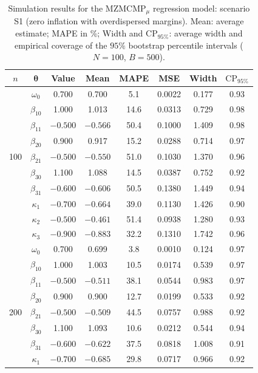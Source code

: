 \begin{table}[pos=htbp]
	\centering
	\caption{Simulation results for the $\mathrm{MZMCMP}_{\mu}$ regression model: scenario S1 (zero inflation with overdispersed margins). Mean: average estimate; MAPE in \%; Width and $\mathrm{CP}_{95\%}$: average width and empirical coverage of the $95\%$ bootstrap percentile intervals ($N=100$, $B=500$).}
	\label{tab:sim_S1}
	\begin{tabular}{@{}cccccccc@{}}
		\toprule
		$n$ & $\bm{\theta}$ & Value & Mean & MAPE & MSE & Width & $\mathrm{CP}_{95\%}$ \\
		\midrule
		 & $\omega_0$ & 0.700 & 0.700 & 5.1 & 0.0022 & 0.177 & 0.93 \\
		 & $\beta_{10}$ & 1.000 & 1.013 & 14.6 & 0.0313 & 0.729 & 0.98 \\
		 & $\beta_{11}$ & $-0.500$ & $-0.566$ & 50.4 & 0.1000 & 1.409 & 0.98 \\
		 & $\beta_{20}$ & 0.900 & 0.917 & 15.2 & 0.0288 & 0.714 & 0.97 \\
		100 & $\beta_{21}$ & $-0.500$ & $-0.550$ & 51.0 & 0.1030 & 1.370 & 0.96 \\
		 & $\beta_{30}$ & 1.100 & 1.088 & 14.5 & 0.0387 & 0.752 & 0.92 \\
		 & $\beta_{31}$ & $-0.600$ & $-0.606$ & 50.5 & 0.1380 & 1.449 & 0.94 \\
		 & $\kappa_1$ & $-0.700$ & $-0.664$ & 39.0 & 0.1130 & 1.426 & 0.90 \\
		 & $\kappa_2$ & $-0.500$ & $-0.461$ & 51.4 & 0.0938 & 1.280 & 0.93 \\
		 & $\kappa_3$ & $-0.900$ & $-0.883$ & 32.2 & 0.1310 & 1.742 & 0.96 \\
		\midrule
		 & $\omega_0$ & 0.700 & 0.699 & 3.8 & 0.0010 & 0.124 & 0.97 \\
		 & $\beta_{10}$ & 1.000 & 1.003 & 10.5 & 0.0174 & 0.539 & 0.97 \\
		 & $\beta_{11}$ & $-0.500$ & $-0.511$ & 38.1 & 0.0544 & 0.983 & 0.97 \\
		 & $\beta_{20}$ & 0.900 & 0.900 & 12.7 & 0.0199 & 0.533 & 0.92 \\
		200 & $\beta_{21}$ & $-0.500$ & $-0.509$ & 44.5 & 0.0757 & 0.988 & 0.92 \\
		 & $\beta_{30}$ & 1.100 & 1.093 & 10.6 & 0.0212 & 0.544 & 0.94 \\
		 & $\beta_{31}$ & $-0.600$ & $-0.622$ & 37.5 & 0.0818 & 1.008 & 0.91 \\
		 & $\kappa_1$ & $-0.700$ & $-0.685$ & 29.8 & 0.0717 & 0.966 & 0.92 \\

\end{tabular}
\end{table}
